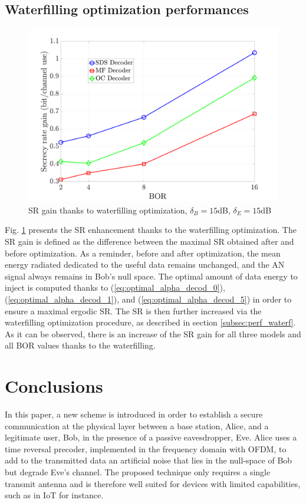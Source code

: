 \documentclass[journal,comsoc]{IEEEtran}
\let\MYoriglatexcaption\caption
\renewcommand{\caption}[2][\relax]{\MYoriglatexcaption[#2]{#2}}
\begin{document}
\subsection{Waterfilling optimization performances}
\begin{figure}[h!t]
	\centering
	\includegraphics[width=1\linewidth]{graphs/SR_gain.pdf}
	\caption{SR gain thanks to waterfilling optimization, $\delta_B  = 15$dB, $\delta_E = 15$dB}
	\label{fig_waterfilling_opt}
\end{figure}
Fig. \ref{fig_waterfilling_opt} presents the SR enhancement thanks to the waterfilling optimization. The SR gain is defined as the difference between the maximal SR obtained after and before optimization. As a reminder, before and after optimization, the mean energy radiated dedicated to the useful data remains unchanged, and the AN signal always remains in Bob's null space. The optimal amount of data energy to inject is computed thanks to (\ref{eq:optimal_alpha_decod_0}), (\ref{eq:optimal_alpha_decod_1}), and (\ref{eq:optimal_alpha_decod_5}) in order to ensure a maximal ergodic SR. The SR is then further increased via the waterfilling optimization procedure, as described in section \ref{subsec:perf_waterf}. As it can be observed, there is an increase of the SR gain for all three models and all BOR values thanks to the waterfilling. 

\section{Conclusions}\label{sec:conclusions}
In this paper, a new scheme is introduced in order to establish a secure communication at the physical layer between a base station, Alice, and a legitimate user, Bob, in the presence of a passive eavesdropper, Eve. Alice uses a time reversal precoder, implemented in the frequency domain with OFDM, to add to the transmitted data an artificial noise that lies in the null-space of Bob but degrade Eve’s channel. The proposed technique only requires a single transmit antenna and is therefore well suited for devices with limited capabilities, such as in IoT for instance. 
\end{document}
